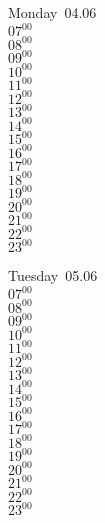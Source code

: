 \documentclass[11pt, a4paper]{book}\usepackage[]{graphicx}\usepackage[]{color}
\begin{document}
\begin{headerbox}
\end{headerbox}
\begin{weekdaybox}
  Monday~04.06\\
  { 
  \vfill
  $07^{00}$\\
$08^{00}$\\
$09^{00}$\\
$10^{00}$\\
$11^{00}$\\
$12^{00}$\\
$13^{00}$\\
$14^{00}$\\
$15^{00}$\\
$16^{00}$\\
$17^{00}$\\
$18^{00}$\\
$19^{00}$\\
$20^{00}$\\
$21^{00}$\\
$22^{00}$\\
$23^{00}$\\
  }
\end{weekdaybox}
\begin{weekdaybox}
  Tuesday~05.06\\
  { 
  \vfill
  $07^{00}$\\
$08^{00}$\\
$09^{00}$\\
$10^{00}$\\
$11^{00}$\\
$12^{00}$\\
$13^{00}$\\
$14^{00}$\\
$15^{00}$\\
$16^{00}$\\
$17^{00}$\\
$18^{00}$\\
$19^{00}$\\
$20^{00}$\\
$21^{00}$\\
$22^{00}$\\
$23^{00}$\\
  }
\end{weekdaybox}
\end{document}
